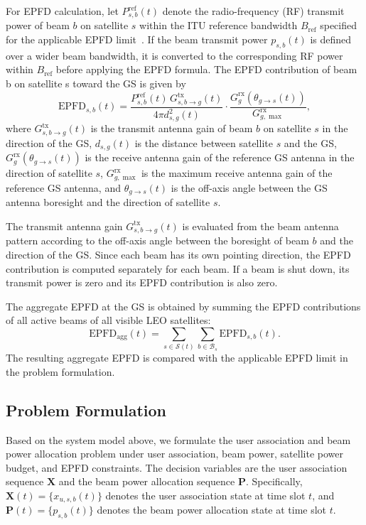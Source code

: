 For EPFD calculation, let $P_{s,b}^{\mathrm{ref}}(t)$ denote the radio-frequency (RF) transmit power of beam $b$ on satellite $s$ within the ITU reference bandwidth $B_{\mathrm{ref}}$ specified for the applicable EPFD limit~\cite{itur_s1528_2001,itur_s1428_2001}. If the beam transmit power $p_{s,b}(t)$ is defined over a wider beam bandwidth, it is converted to the corresponding RF power within $B_{\mathrm{ref}}$ before applying the EPFD formula. The EPFD contribution of beam b on satellite s toward the GS is given by
\begin{equation*}
\mathrm{EPFD}_{s,b}(t)=
\frac{P_{s,b}^{\mathrm{ref}}(t)\,G^{\mathrm{tx}}_{s,b\to g}(t)}
{4\pi d_{s,g}^{2}(t)}
\cdot
\frac{G_g^{\mathrm{rx}}(\theta_{g\to s}(t))}
{G_{g,\max}^{\mathrm{rx}}},
\end{equation*}
where $G^{\mathrm{tx}}_{s,b\to g}(t)$ is the transmit antenna gain of beam $b$ on satellite $s$ in the direction of the GS, $d_{s,g}(t)$ is the distance between satellite $s$ and the GS, $G_g^{\mathrm{rx}}(\theta_{g\to s}(t))$ is the receive antenna gain of the reference GS antenna in the direction of satellite $s$, $G_{g,\max}^{\mathrm{rx}}$ is the maximum receive antenna gain of the reference GS antenna, and $\theta_{g\to s}(t)$ is the off-axis angle between the GS antenna boresight and the direction of satellite $s$.

The transmit antenna gain $G^{\mathrm{tx}}_{s,b\to g}(t)$ is evaluated from the beam antenna pattern according to the off-axis angle between the boresight of beam $b$ and the direction of the GS. Since each beam has its own pointing direction, the EPFD contribution is computed separately for each beam. If a beam is shut down, its transmit power is zero and its EPFD contribution is also zero.

The aggregate EPFD at the GS is obtained by summing the EPFD contributions of all active beams of all visible LEO satellites:
\begin{equation*}
\mathrm{EPFD}_{\mathrm{agg}}(t)=\sum_{s\in\mathcal{S}(t)}\sum_{b\in\mathcal{B}_s} \mathrm{EPFD}_{s,b}(t).
\end{equation*}
The resulting aggregate EPFD is compared with the applicable EPFD limit in the problem formulation.

\subsection{Problem Formulation}
\label{sec:problem_formulation}

Based on the system model above, we formulate the user association and beam power allocation problem under user association, beam power, satellite power budget, and EPFD constraints. The decision variables are the user association sequence $\mathbf{X}$ and the beam power allocation sequence $\mathbf{P}$. Specifically, $\mathbf{X}(t)=\{x_{u,s,b}(t)\}$ denotes the user association state at time slot $t$, and $\mathbf{P}(t)=\{p_{s,b}(t)\}$ denotes the beam power allocation state at time slot $t$.

